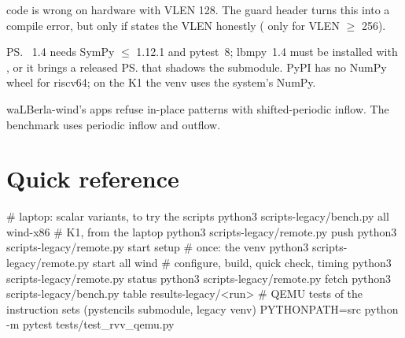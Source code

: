 \begin{pitfall}
   code is wrong on hardware with VLEN 128. The guard header turns
  this into a compile error, but only if  states the VLEN honestly
  ( only for VLEN $\geq$ 256).
\end{pitfall}

\begin{pitfall}
  \ps{}~1.4 needs SymPy $\leq$ 1.12.1 and pytest~8; lbmpy~1.4 must be installed with
  , or it brings a released \ps{} that shadows the submodule. PyPI has no
  NumPy wheel for riscv64; on the K1 the venv uses the system's NumPy.
\end{pitfall}

\begin{pitfall}
  waLBerla-wind's apps refuse in-place patterns with shifted-periodic inflow. The
  benchmark uses periodic inflow and outflow.
\end{pitfall}

\section*{Quick reference}

\begin{shcode}
# laptop: scalar variants, to try the scripts
python3 scripts-legacy/bench.py all wind-x86
# K1, from the laptop
python3 scripts-legacy/remote.py push
python3 scripts-legacy/remote.py start setup        # once: the venv
python3 scripts-legacy/remote.py start all wind     # configure, build, quick check, timing
python3 scripts-legacy/remote.py status
python3 scripts-legacy/remote.py fetch
python3 scripts-legacy/bench.py table results-legacy/<run>
# QEMU tests of the instruction sets (pystencils submodule, legacy venv)
PYTHONPATH=src python -m pytest tests/test_rvv_qemu.py
\end{shcode}

